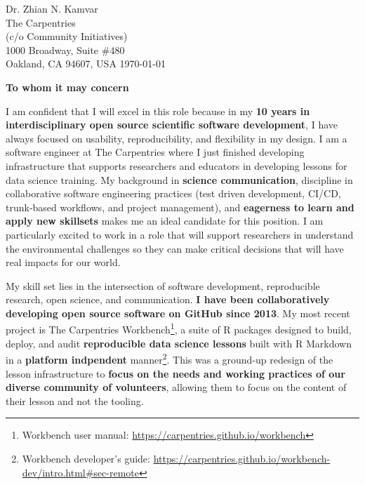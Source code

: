 


\clearpage
\begin{flushright}
  Dr. Zhian N. Kamvar\\
  The Carpentries\\
  (c/o Community Initiatives)\\
  1000 Broadway, Suite \#480\\
  Oakland, CA 94607, USA
  \today
\end{flushright}

\textbf{To whom it may concern}

\vspace{2ex}

I am confident that I will excel in
this role because in my \textbf{10 years in interdisciplinary open source
scientific software development}, I have always focused on usability,
reproducibility, and flexibility in my design.
I am a software engineer at The Carpentries where I just finished developing
infrastructure that supports researchers and educators in developing lessons
for data science training. 
My background in \textbf{science communication}, discipline in collaborative
software engineering practices (test driven development, CI/CD, trunk-based
workflows, and project management), and \textbf{eagerness to learn and apply
new skillsets} makes me an ideal candidate for this position. 
I am particularly excited to work in a role that will support researchers in
understand the environmental challenges so they can make critical decisions
that will have real impacts for our world.

\vspace{2ex}

My skill set lies in the intersection of software development,
reproducible research, open science, and communication. 
\textbf{I have been collaboratively developing open source software on GitHub
since 2013}.
My most recent project is The Carpentries Workbench\footnote{Workbench user manual: \url{https://carpentries.github.io/workbench}}, 
a suite of R packages designed to build, deploy, and audit \textbf{reproducible
data science lessons} built with R Markdown in a \textbf{platform indpendent} manner\footnote{Workbench developer's guide: \url{https://carpentries.github.io/workbench-dev/intro.html\#sec-remote}}.
This was a ground-up redesign of the lesson infrastructure to \textbf{focus on
the needs and working practices of our diverse community of volunteers},
allowing them to focus on the content of their lesson and not the tooling.


